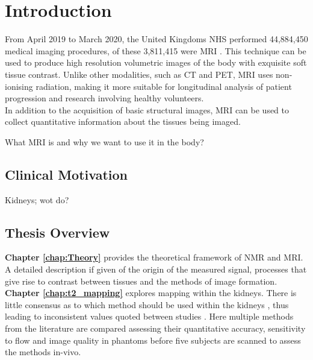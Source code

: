\chapter*{Introduction}
From April 2019 to March 2020, the United Kingdoms \ac{NHS} performed 44,884,450 medical imaging procedures, of these 3,811,415 were \ac{MRI} \cite{noauthor_diagnostic_2020}. This technique can be used to produce high resolution volumetric images of the body with exquisite soft tissue contrast. Unlike other modalities, such as \ac{CT} and \ac{PET}, \ac{MRI} uses non-ionising radiation, making it more suitable for longitudinal analysis of patient progression and research involving healthy volunteers.\\

In addition to the acquisition of basic structural images, \ac{MRI} can be used to collect quantitative information about the tissues being imaged.

What MRI is and why we want to use it in the body?

\section*{Clinical Motivation}
Kidneys; wot do? 

\section*{Thesis Overview}

\textbf{Chapter \ref{chap:Theory}} provides the theoretical framework of \ac{NMR} and \ac{MRI}. A detailed description if given of the origin of the measured signal, processes that give rise to contrast between tissues and the methods of image formation. \\

\textbf{Chapter \ref{chap:t2_mapping}} explores \ttwo mapping within the kidneys. There is little consensus as to which method should be used within the kidneys \cite{dekkers_consensus-based_2019}, thus leading to inconsistent values quoted between studies \cite{wolf_magnetic_2018}. Here multiple methods from the literature are compared assessing their quantitative accuracy, sensitivity to flow and image quality in phantoms before five subjects are scanned to assess the methods in-vivo.\\

